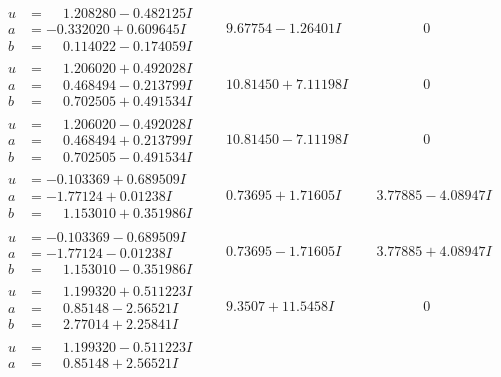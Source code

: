 \documentclass[1p]{elsarticle_modified}
\theoremstyle{definition}
\begin{document}
$$\begin{array}{c|c|c}
\begin{aligned}
u &= \phantom{-}1.208280 - 0.482125 I \\
a &= -0.332020 + 0.609645 I \\
b &= \phantom{-}0.114022 - 0.174059 I\end{aligned}
 & \phantom{-}9.67754 - 1.26401 I & \phantom{-0.000000 } 0 \\ \hline\begin{aligned}
u &= \phantom{-}1.206020 + 0.492028 I \\
a &= \phantom{-}0.468494 - 0.213799 I \\
b &= \phantom{-}0.702505 + 0.491534 I\end{aligned}
 & \phantom{-}10.81450 + 7.11198 I & \phantom{-0.000000 } 0 \\ \hline\begin{aligned}
u &= \phantom{-}1.206020 - 0.492028 I \\
a &= \phantom{-}0.468494 + 0.213799 I \\
b &= \phantom{-}0.702505 - 0.491534 I\end{aligned}
 & \phantom{-}10.81450 - 7.11198 I & \phantom{-0.000000 } 0 \\ \hline\begin{aligned}
u &= -0.103369 + 0.689509 I \\
a &= -1.77124 + 0.01238 I \\
b &= \phantom{-}1.153010 + 0.351986 I\end{aligned}
 & \phantom{-}0.73695 + 1.71605 I & \phantom{-}3.77885 - 4.08947 I \\ \hline\begin{aligned}
u &= -0.103369 - 0.689509 I \\
a &= -1.77124 - 0.01238 I \\
b &= \phantom{-}1.153010 - 0.351986 I\end{aligned}
 & \phantom{-}0.73695 - 1.71605 I & \phantom{-}3.77885 + 4.08947 I \\ \hline\begin{aligned}
u &= \phantom{-}1.199320 + 0.511223 I \\
a &= \phantom{-}0.85148 - 2.56521 I \\
b &= \phantom{-}2.77014 + 2.25841 I\end{aligned}
 & \phantom{-}9.3507 + 11.5458 I & \phantom{-0.000000 } 0 \\ \hline\begin{aligned}
u &= \phantom{-}1.199320 - 0.511223 I \\
a &= \phantom{-}0.85148 + 2.56521 I \\

\end{aligned}
\end{array}$$
\end{document}
